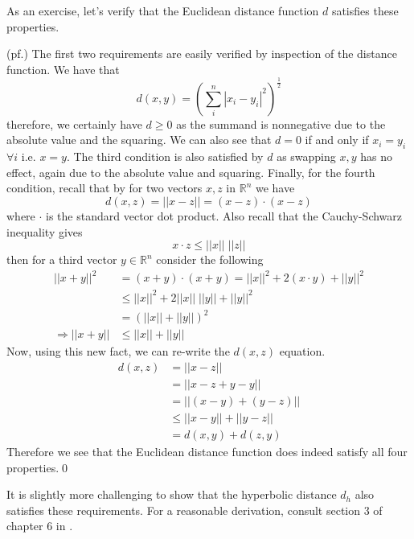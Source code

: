 \documentclass[a4paper, 12pt]{article}
\newcommand{\R}{\mathbb{R}}
\newenvironment{solution}{%
	\begin{list}{}{%
			\setlength{\topsep}{0pt}%
			\setlength{\leftmargin}{1.5cm}%
			\setlength{\rightmargin}{1.5cm}%
			\setlength{\listparindent}{\parindent}%
			\setlength{\itemindent}{\parindent}%
			\setlength{\parsep}{\parskip}%
		}%
		\item[]}{\end{list}}
\begin{document}
As an exercise, let's verify that the Euclidean distance function $d$ satisfies these properties.
\begin{solution}
  \noindent(pf.) The first two requirements are easily verified by inspection of the distance function. We have that
  \begin{equation*}
    d(x,y) = \left(\sum_i^n |x_i-y_i|^2\right)^{\frac{1}{2}}
  \end{equation*}
  therefore, we certainly have $d\geq 0$ as the summand is nonnegative due to the absolute value and the squaring. We can also see that $d=0$ if and only if $x_i =y_i$ $\forall i$ i.e. $x=y$. The third condition is also satisfied by $d$ as swapping $x,y$ has no effect, again due to the absolute value and squaring. Finally, for the fourth condition, recall that by for two vectors $x,z$ in $\R^n$ we have
  \begin{equation*}
    d(x,z) = ||x-z|| = (x-z)\cdot(x-z)
  \end{equation*}
  where $\cdot$ is the standard vector dot product. Also recall that the Cauchy-Schwarz inequality gives
  \begin{equation*}
    x\cdot z \leq ||x||\;||z||
  \end{equation*}
  then for a third vector $y\in\R^n$ consider the following
  \begin{align*}
    ||x+y||^2 &= (x+y)\cdot(x+y) = ||x||^2+2(x\cdot y) + ||y||^2 \\
    &\leq ||x||^2+2||x||\;||y|| + ||y||^2 \\
    &= \left(||x||+||y||\right)^2 \\
    \Rightarrow ||x+y|| &\leq ||x|| + ||y|| 
  \end{align*}
  Now, using this new fact, we can re-write the $d(x,z)$ equation.
  \begin{align*}
    d(x,z) &= ||x-z|| \\
    &= ||x-z+y-y|| \\
    &= ||(x-y) + (y-z)|| \\
    &\leq ||x-y|| + ||y-z|| \\
    &= d(x,y) + d(z,y) 
  \end{align*}
    Therefore we see that the Euclidean distance function does indeed satisfy all four properties.\qed
\end{solution}

It is slightly more challenging to show that the hyperbolic distance $d_h$ also satisfies these requirements. For a reasonable derivation, consult section 3 of chapter 6 in \cite{brannan}.  
\end{document}
